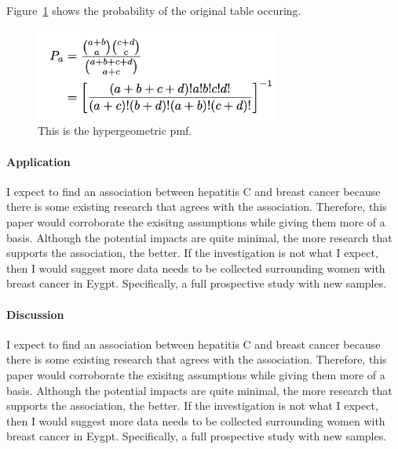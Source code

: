 \documentclass[12pt, titlepage]{article}
\begin{document}
Figure~\ref{fig:formula} shows the probability of the original table occuring.

\begin{figure}[tbp]
  \centering
  \includegraphics[width=8cm]{formula.png}
  \caption{This is the hypergeometric pmf.}
  \label{fig:formula}
\end{figure}


\paragraph{Application}
\label{sec:app}
I expect to find an association between hepatitis C and breast cancer because there is some existing research that agrees with the association.
Therefore, this paper would corroborate the exisitng assumptions while giving them more of a basis. Although the potential impacts are quite 
minimal, the more research that supports the association, the better. If the investigation is not what I expect, then I would suggest more
data needs to be collected surrounding women with breast cancer in Eygpt. Specifically, a full prospective study with new samples. 


\paragraph{Discussion}
\label{sec:discuss}
I expect to find an association between hepatitis C and breast cancer because there is some existing research that agrees with the association.
Therefore, this paper would corroborate the exisitng assumptions while giving them more of a basis. Although the potential impacts are quite 
minimal, the more research that supports the association, the better. If the investigation is not what I expect, then I would suggest more
data needs to be collected surrounding women with breast cancer in Eygpt. Specifically, a full prospective study with new samples. 




\end{document}
